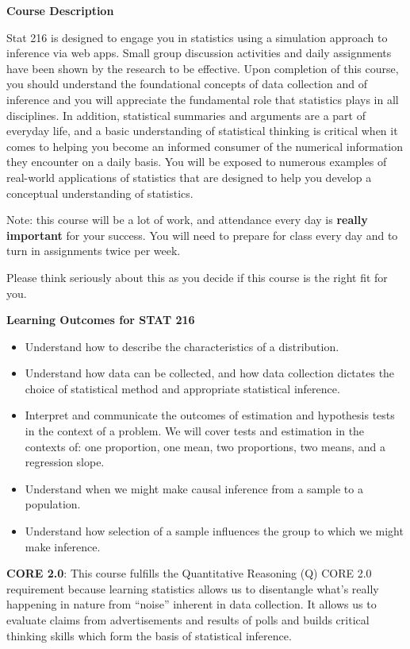 \newpage

 
{\bf Course Description }
 
Stat 216 is designed to engage you in statistics using a 
simulation approach to inference via web apps. Small group
discussion activities and daily assignments have been shown by the
research to be effective. Upon completion of this
course, you should  understand the foundational concepts
of data collection and of inference and you will appreciate the
fundamental role that statistics plays in all disciplines.  In
addition, statistical summaries and arguments are a part of everyday
life, and a basic understanding of statistical thinking is critical
when it comes to helping you become an informed consumer of the
numerical information they encounter on a daily basis.   You will be
exposed to numerous examples of real-world applications of statistics
that are designed to help you develop a conceptual understanding of
statistics.     
 
Note: this course will be a lot of work, and attendance every day is
{\bf really important} for your success. You will need to prepare for class
every day and to turn in assignments twice per week.

Please think seriously about this as you decide if this course is the
right fit for you.    

   \begin{center}
     {\bf Learning Outcomes for STAT 216 }
   \end{center}
   \begin{itemize}
   \item Understand how to describe the characteristics of a distribution.
   \item Understand how data can be collected, and how data collection
     dictates the choice of statistical method and appropriate
     statistical inference.
   \item Interpret and communicate the outcomes of estimation and
     hypothesis tests in the context of a problem. We will cover tests
     and estimation in the contexts of: one proportion, one mean, two
     proportions, two means, and a regression slope.   
   \item Understand when we might make causal inference from a
     sample to a population.
   \item Understand how selection of a sample influences the
     group to which we might make inference.
   \end{itemize}
    

{\bf CORE 2.0}:  This course fulfills the Quantitative Reasoning (Q)
CORE 2.0 requirement because learning statistics allows us to
disentangle what's really happening in nature from ``noise'' inherent in
data collection. It allows us to evaluate claims from advertisements
and results of polls and builds critical thinking skills which form
the basis of statistical inference.   

